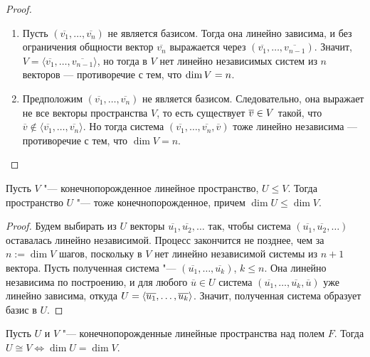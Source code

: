     \begin{proof}~
    	\begin{enumerate}
    		\item Пусть $(\overline{v_1}, \dots, \overline{v_n})$ не является базисом. Тогда она линейно зависима, и без ограничения общности вектор $\overline{v_n}$ выражается через $(\overline{v_1}, \dots, \overline{v_{n - 1}})$. Значит, $V = \langle\overline{v_1}, \dots, \overline{v_{n - 1}}\rangle$, но тогда в $V$ нет линейно независимых систем из $n$ векторов --- противоречие с тем, что $\dim{V} \hm{=} n$.
    		\item Предположим $(\overline{v_1}, \dots, \overline{v_n})$ не является базисом. Следовательно, она выражает не все векторы пространства $V$, то есть существует $\overline{v} \hm{\in} V$ такой, что $\overline{v} \not\in \langle\overline{v_1}, \dots, \overline{v_n}\rangle$. Но тогда система $(\overline{v_1},\dots,\overline{v_n},\overline{v})$ тоже линейно независима --- противоречие с тем, что $\dim{V} = n$.\qedhere
    	\end{enumerate}
    \end{proof}
    
    \begin{proposition}
    	Пусть $V$ "--- конечнопорожденное линейное пространство, $U \le V$. Тогда пространство $U$ "--- тоже конечнопорожденное, причем $\dim{U} \le \dim{V}$.
    \end{proposition}
    
    \begin{proof}
    	Будем выбирать из $U$ векторы $\overline{u_1}, \overline{u_2}, \dots$ так, чтобы система $(\overline{u_1}, \overline{u_2}, \dots)$ оставалась линейно независимой. Процесс закончится не позднее, чем за $n := \dim{V}$ шагов, поскольку в $V$ нет линейно независимой системы из $n + 1$ вектора. Пусть полученная система "--- $(\overline{u_1}, \dots, \overline{u_k})$, $k \le n$. Она линейно независима по построению, и для любого $\overline{u} \in U$ система $(\overline{u_1}, \dots, \overline{u_k}, \overline{u})$ уже линейно зависима, откуда $U = \langle\overline{u_1}, \dots, \overline{u_k}\rangle$. Значит, полученная система образует базис в $U$.
    \end{proof}
    
    \begin{theorem}
    	Пусть $U$ и $V$ "--- конечнопорожденные линейные пространства над полем $F$. Тогда $U \cong V \Leftrightarrow \dim{U} = \dim{V}$.
    \end{theorem}
    
